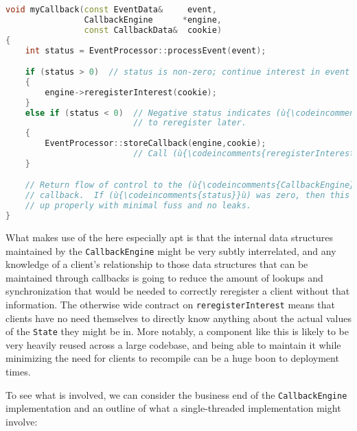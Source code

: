 \begin{lstlisting}[language=C++]
void myCallback(const EventData&     event,
                CallbackEngine      *engine,
                const CallbackData&  cookie)
{
    int status = EventProcessor::processEvent(event);

    if (status > 0)  // status is non-zero; continue interest in event
    {
        engine->reregisterInterest(cookie);
    }
    else if (status < 0)  // Negative status indicates (ù{\codeincomments{EventProcessor}}ù) wants
                          // to reregister later.
    {
        EventProcessor::storeCallback(engine,cookie);
                          // Call (ù{\codeincomments{reregisterInterest}}ù) later.
    }

    // Return flow of control to the (ù{\codeincomments{CallbackEngine}}ù) that invoked this
    // callback.  If (ù{\codeincomments{status}}ù) was zero, then this callback should be cleaned
    // up properly with minimal fuss and no leaks.
}
\end{lstlisting}

\noindent What makes use of the  here especially apt is
that the internal data structures maintained by the
\lstinline!CallbackEngine! might be very subtly interrelated, and any
knowledge of a client's relationship to those data structures that can
be maintained through callbacks is going to reduce the amount of lookups
and synchronization that would be needed to correctly reregister a
client without that information. The otherwise wide contract on
\lstinline!reregisterInterest! means that clients have no need themselves
to directly know anything about the actual values of the \lstinline!State!
they might be in. More notably, a component like this is likely to be
very heavily reused across a large codebase, and being able to maintain
it while minimizing the need for clients to recompile can be a huge boon
to deployment times.

To see what is involved, we can consider the business end of the
\lstinline!CallbackEngine! implementation and an outline of what a
single-threaded implementation might involve:

